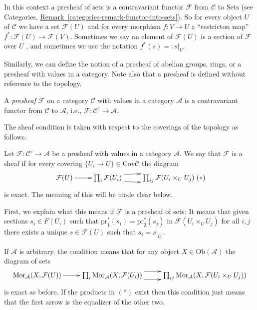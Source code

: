 \noindent
In this context a presheaf of sets is a contravariant functor
$\mathcal{F}$ from $\mathcal{C}$ to $\text{Sets}$ (see Categories, 
\hyperref[categories-remark-functor-into-sets]%
{Remark~\ref*{categories-remark-functor-into-sets}}). 
So for every object $U$ of $\mathcal{C}$ we have a set 
$\mathcal{F}(U)$ and for every morphism
$f : V \to U$ a ``restricton map'' $f^\ast : \mathcal{F}(U) \to 
\mathcal{F}(V)$. Sometimes we say an element
of $\mathcal{F}(U)$ is a section of $\mathcal{F}$ over $U$ , and sometimes
we use the notation $f^\ast(s) =: s|_V$. 

\smallskip\noindent
Similarly, we can define the notion of a presheaf of abelian groups, rings,
or a presheaf with values in a category. Note also that a presheaf is defined
without reference to the topology.

\begin{definition}
\label{definition-presheaf}
A {\it presheaf} $\mathcal{F}$ on a category $\mathcal{C}$
with values in a category $\mathcal{A}$ is a contravariant
functor from $\mathcal{C}$ to $\mathcal{A}$,
i.e., $\mathcal{F} : \mathcal{C}^\circ \to \mathcal{A}$.
\end{definition}

\noindent
The sheaf condition is taken with respect to the coverings of the 
topology as follows.

\begin{definition}
\label{definition-sheaf}
Let $\mathcal{F} : \mathcal{C}^\circ \to \mathcal{A}$ be a presheaf 
with values in a category $\mathcal{A}$. We say that $\mathcal{F}$ 
is a sheaf if for every covering $\{U_i \to U\} \in \text{Cov} \mathcal{C}$ 
the diagram
$$
\xymatrix{
\mathcal{F}(U) \ar[r] 
& 
\prod\nolimits_i \mathcal{F}(U_i) \ar@/^/[r] \ar@/_/[r] 
&
\prod\nolimits_{ij} \mathcal{F}(U_i\times_U U_j)
}
\leqno{(*)}
$$
is exact. The meaning of this will be made clear below.
\end{definition}

\noindent
First, we explain what this means if $\mathcal{F}$ is a presheaf of sets:
It means that given sections $s_i \in F(U_i)$ such that
$\text{pr}_1^\ast(s_i) = \text{pr}_2^\ast(s_j)$ in 
$\mathcal{F}(U_i \times_U U_j)$ for all $i,j$ there exists a unique
$s \in \mathcal{F}(U)$ such that $s_i = s|_{U_i}$.

\smallskip\noindent
If $\mathcal{A}$ is arbitrary, the condition means that for any
object $X\in \text{Ob}(\mathcal{A})$ the diagram of sets
$$
\xymatrix{
\text{Mor}_\mathcal{A}(X,\mathcal{F}(U)) \ar[r] 
& 
\prod\nolimits_i \text{Mor}_\mathcal{A}(X,\mathcal{F}(U_i)) 
\ar@/^/[r] \ar@/_/[r] 
&
\prod\nolimits_{ij} \text{Mor}_\mathcal{A}(X,\mathcal{F}(U_i\times_U U_j))
}
$$
is exact as before. If the products in $(*)$ exist then this condition just
means that the first arrow is the equalizer of the other two.

